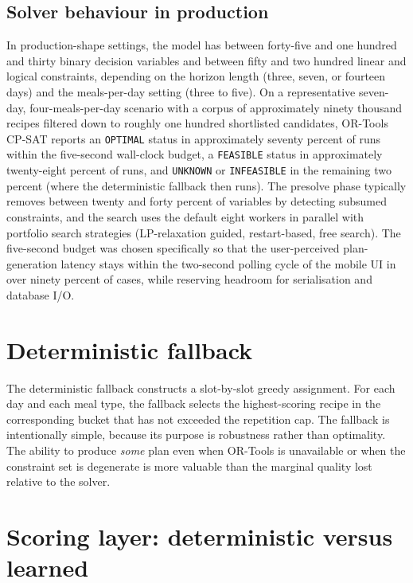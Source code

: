 \subsection{Solver behaviour in production}

In production-shape settings, the model has between forty-five and one hundred and thirty binary decision variables and between fifty and two hundred linear and logical constraints, depending on the horizon length (three, seven, or fourteen days) and the meals-per-day setting (three to five). On a representative seven-day, four-meals-per-day scenario with a corpus of approximately ninety thousand recipes filtered down to roughly one hundred shortlisted candidates, OR-Tools CP-SAT reports an \texttt{OPTIMAL} status in approximately seventy percent of runs within the five-second wall-clock budget, a \texttt{FEASIBLE} status in approximately twenty-eight percent of runs, and \texttt{UNKNOWN} or \texttt{INFEASIBLE} in the remaining two percent (where the deterministic fallback then runs). The presolve phase typically removes between twenty and forty percent of variables by detecting subsumed constraints, and the search uses the default eight workers in parallel with portfolio search strategies (LP-relaxation guided, restart-based, free search). The five-second budget was chosen specifically so that the user-perceived plan-generation latency stays within the two-second polling cycle of the mobile UI in over ninety percent of cases, while reserving headroom for serialisation and database I/O.


\section{Deterministic fallback}

The deterministic fallback constructs a slot-by-slot greedy assignment. For each day and each meal type, the fallback selects the highest-scoring recipe in the corresponding bucket that has not exceeded the repetition cap. The fallback is intentionally simple, because its purpose is robustness rather than optimality. The ability to produce \emph{some} plan even when OR-Tools is unavailable or when the constraint set is degenerate is more valuable than the marginal quality lost relative to the solver.

\section{Scoring layer: deterministic versus learned}


